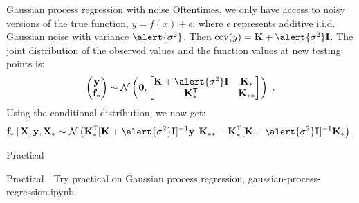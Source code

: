 \begin{frame}{Gaussian process regression with noise}
Oftentimes, we only have access to noisy versions of the true function, $y = f(x) + \epsilon$, where $\epsilon$ represents additive i.i.d. Gaussian noise with variance $\alert{\sigma^2}$. Then $\text{cov}(y) = \mathbf{K} + \alert{\sigma^2} \mathbf{I}$. The joint distribution of the observed values and the function values at new testing points is:
%
    \begin{align}
       \begin{pmatrix}\mathbf{y} \\ \mathbf{f}_*\end{pmatrix} \sim\mathcal{N}\left(\mathbf{0}, \begin{bmatrix}\mathbf{K} + \alert{\sigma^2} \mathbf{I} & \mathbf{K}_* \\ \mathbf{K}_*^\mathsf{T} & \mathbf{K}_{**}\end{bmatrix}\right) \ . \nonumber
    \end{align}
%
Using the conditional distribution, we now get:
%
    \begin{align}
       \mathbf{{f}_*} \, \vert \, \mathbf{X}, \mathbf{y}, \mathbf{X}_* \sim \mathcal{N} \left(\mathbf{K}_*^\mathsf{T} [\mathbf{K} + \alert{\sigma^2} \mathbf{I}]^{-1} \mathbf{y}, \mathbf{K}_{**} - \mathbf{K}_*^\mathsf{T} [\mathbf{K} + \alert{\sigma^2} \mathbf{I}]^{-1} \mathbf{K}_*\right). \nonumber
    \end{align}	
\end{frame}

\begin{frame}{Practical}
\begin{alertblock}{Practical}
	\ComputerMouse\,\, Try practical on Gaussian process regression,  \alert{gaussian-process-regression.ipynb}.
\end{alertblock}
\end{frame}


%
%
%
%
%
%

